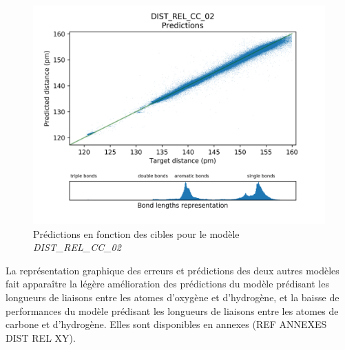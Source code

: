 \begin{figure}[!h]
	\centering
	
	\includegraphics[scale=0.8]{../figures/DIST_REL_CC_02/DIST_REL_CC_02_preds_targets.png}	
	
	\caption{Prédictions en fonction des cibles pour le modèle \emph{DIST\_REL\_CC\_02}}
	
\end{figure}

\par La représentation graphique des erreurs et prédictions des deux autres modèles fait apparaître la légère amélioration des prédictions du modèle prédisant les longueurs de liaisons entre les atomes d'oxygène et d'hydrogène, et la baisse de performances du modèle prédisant les longueurs de liaisons entre les atomes de carbone et d'hydrogène. Elles sont disponibles en annexes (REF ANNEXES DIST REL XY).
	
